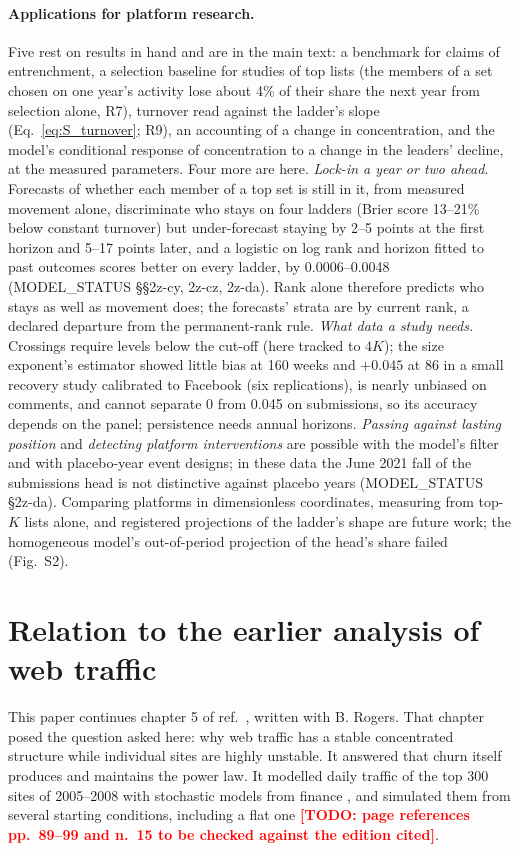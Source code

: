 \documentclass[10pt]{article}
\newcommand{\todo}[1]{\textcolor{red}{\textbf{[TODO: #1]}}}
\newif\iffinal \finalfalse   %
\begin{document}
\paragraph{Applications for platform research.} Five rest on results in hand and are in the main text: a benchmark for claims of entrenchment, a selection baseline for studies of top lists (the members of a set chosen on one year's activity lose about 4\% of their share the next year from selection alone, R7), turnover read against the ladder's slope (Eq.~\ref{eq:S_turnover}; R9), an accounting of a change in concentration, and the model's conditional response of concentration to a change in the leaders' decline, at the measured parameters. Four more are here. \emph{Lock-in a year or two ahead.} Forecasts of whether each member of a top set is still in it, from measured movement alone, discriminate who stays on four ladders (Brier score 13--21\% below constant turnover) but under-forecast staying by 2--5 points at the first horizon and 5--17 points later, and a logistic on log rank and horizon fitted to past outcomes scores better on every ladder, by 0.0006--0.0048 (MODEL\_STATUS \S\S2z-cy, 2z-cz, 2z-da). Rank alone therefore predicts who stays as well as movement does; the forecasts' strata are by current rank, a declared departure from the permanent-rank rule. \emph{What data a study needs.} Crossings require levels below the cut-off (here tracked to $4K$); the size exponent's estimator showed little bias at 160 weeks and $+0.045$ at 86 in a small recovery study calibrated to Facebook (six replications), is nearly unbiased on comments, and cannot separate 0 from 0.045 on submissions, so its accuracy depends on the panel; persistence needs annual horizons. \emph{Passing against lasting position} and \emph{detecting platform interventions} are possible with the model's filter and with placebo-year event designs; in these data the June 2021 fall of the submissions head is not distinctive against placebo years (MODEL\_STATUS \S2z-da). Comparing platforms in dimensionless coordinates, measuring from top-$K$ lists alone, and registered projections of the ladder's shape are future work; the homogeneous model's out-of-period projection of the head's share failed (Fig.~S2).

\iffinal
\section{Relation to the earlier analysis of web traffic}
This paper continues chapter 5 of ref.~\cite{hindman2018}, written with B. Rogers. That chapter posed the question asked here: why web traffic has a stable concentrated structure while individual sites are highly unstable. It answered that churn itself produces and maintains the power law. It modelled daily traffic of the top 300 sites of 2005--2008 with stochastic models from finance \cite{fernholz2002}, and simulated them from several starting conditions, including a flat one \todo{page references pp.~89--99 and n.~15 to be checked against the edition cited}.
\end{document}
